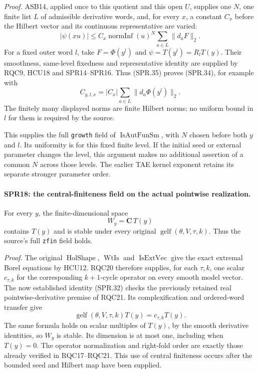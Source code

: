 \emph{Proof.}
ASB14, applied once to this quotient and this open \(U\), supplies
one \(N\), one finite list \(L\) of admissible derivative words,
and, for every \(x\), a constant \(C_x\) before the Hilbert vector
and its continuous representative are varied:
\[
 |\psi(xu)|
 \le C_x\operatorname{normInf}(u)^N
                           \sum_{a\in L}\|d_aF\|_2.
 \tag{SPR.35}
\]
For a fixed outer word \(l\), take
\(F=\Phi(y^l)\) and \(\psi=T(y^l)=R_lT(y)\).
Their smoothness, same-level fixedness and representative identity
are supplied by RQC9, HCU18 and SPR14--SPR16.
Thus (SPR.35) proves (SPR.34), for example with
\[
                  C_{y,l,x}
                  =|C_x|\sum_{a\in L}\|d_a\Phi(y^l)\|_2.
\]
The finitely many displayed norms are finite Hilbert norms;
no uniform bound in \(l\) for them is required by the source.

This supplies the full \texttt{growth} field of
\(\operatorname{IsAutFunSm}\), with \(N\) chosen before both
\(y\) and \(l\).
Its uniformity is for this fixed finite level.  If the initial
seed or external parameter changes the level, this argument
makes no additional assertion of a common \(N\) across those
levels.  The earlier TAE kernel exponent retains its separate
stronger parameter order.

\paragraph{SPR18: the central-finiteness field on the actual pointwise realization.}
\label{claim:SPR18}
For every \(y\), the finite-dimensional space
\[
                         W_y=\mathbf C\,T(y)
 \tag{SPR.36}
\]
contains \(T(y)\) and is stable under every original
\(\operatorname{gelf}(\theta,V,\tau,k)\).
Thus the source's full \texttt{zfin} field holds.

\emph{Proof.}
The original \(\operatorname{HolShape}\),
\(\operatorname{WtIs}\) and \(\operatorname{IsExtVec}\)
give the exact extremal Borel equations by HCU12.
RQC20 therefore supplies, for each \(\tau,k\), one scalar
\(c_{\tau,k}\) for the corresponding \(k+1\)-cycle operator on
every smooth model vector.
The now established identity (SPR.32) checks the previously
retained real pointwise-derivative premise of RQC21.
Its complexification and ordered-word transfer give
\[
             \operatorname{gelf}(\theta,V,\tau,k)T(y)
                          =c_{\tau,k}T(y).
\]
The same formula holds on scalar multiples of \(T(y)\), by
the smooth derivative identities, so \(W_y\) is stable.
Its dimension is at most one, including when \(T(y)=0\).
The operator normalization and right-fold order are exactly
those already verified in RQC17--RQC21.
This use of central finiteness occurs after the bounded seed
and Hilbert map have been supplied.

